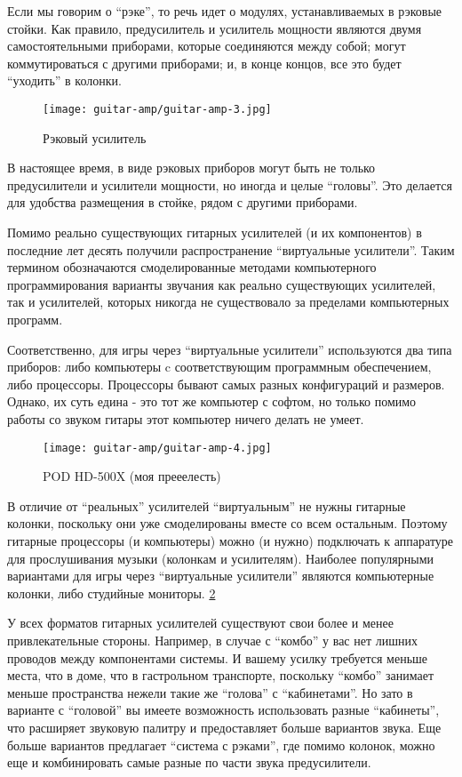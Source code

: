 Если мы говорим о “рэке”, то речь идет о модулях, устанавливаемых в рэковые стойки. Как правило, предусилитель и усилитель мощности являются двумя самостоятельными приборами, которые соединяются между собой; могут коммутироваться с другими приборами; и, в конце концов, все это будет “уходить” в колонки.
\begin{figure}[h]
\begin{center}
\texttt{[image: guitar-amp/guitar-amp-3.jpg]}
\end{center}
\caption{Рэковый усилитель}
\label{guitar-amp:3}
\end{figure}

В настоящее время, в виде рэковых приборов могут быть не только предусилители и усилители мощности, но иногда и целые “головы”. Это делается для удобства размещения в стойке, рядом с другими приборами.

Помимо реально существующих гитарных усилителей (и их компонентов) в последние лет десять получили распространение “виртуальные усилители”. Таким термином обозначаются смоделированные методами компьютерного программирования варианты звучания как реально существующих усилителей, так и усилителей, которых никогда не существовало за пределами компьютерных программ.

Соответственно, для игры через “виртуальные усилители” используются два типа приборов: либо компьютеры c соответствующим программным обеспечением, либо процессоры. Процессоры бывают самых разных конфигураций и размеров. Однако, их суть едина - это тот же компьютер с софтом, но только помимо работы со звуком гитары этот компьютер ничего делать не умеет.
\begin{figure}[h]
\begin{center}
\texttt{[image: guitar-amp/guitar-amp-4.jpg]}
\end{center}
\caption{POD HD-500X (моя прееелесть)}
\label{guitar-amp:POD-HD500X}
\end{figure}

В отличие от “реальных” усилителей “виртуальным” не нужны гитарные колонки, поскольку они уже смоделированы вместе со всем остальным. Поэтому гитарные процессоры (и компьютеры) можно (и нужно) подключать к аппаратуре для прослушивания музыки (колонкам и усилителям). Наиболее популярными вариантами для игры через “виртуальные усилители” являются компьютерные колонки, либо студийные мониторы. \ref{guitar-amp:POD-HD500X} %

У всех форматов гитарных усилителей существуют свои более и менее привлекательные стороны. Например, в случае с “комбо” у вас нет лишних проводов между компонентами системы. И вашему усилку требуется меньше места, что в доме, что в гастрольном транспорте, поскольку “комбо” занимает меньше пространства нежели такие же “голова” с “кабинетами”. Но зато в варианте с “головой” вы имеете возможность использовать разные “кабинеты”, что расширяет звуковую палитру и предоставляет больше вариантов звука. Еще больше вариантов предлагает “система с рэками”, где помимо колонок, можно еще и комбинировать самые разные по части звука предусилители.

